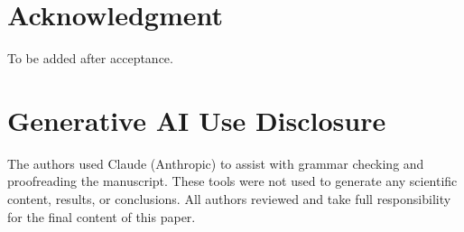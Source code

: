 \documentclass[conference]{IEEEtran}
\begin{document}
\section*{Acknowledgment}

To be added after acceptance.

\newpage

\section{Generative AI Use Disclosure}
The authors used Claude (Anthropic) to assist with grammar checking and proofreading the manuscript. These tools were not used to generate any scientific content, results, or conclusions. All authors reviewed and take full responsibility for the final content of this paper.



\end{document}
